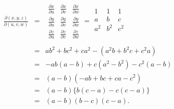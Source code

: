 \documentclass[a4paper,11pt,fleqn]{jarticle}
\begin{document}
\begin{eqnarray*}
\frac{\partial (x, y, z)}{\partial (u, v, w)}&=&
\begin{array}{|ccc|}
\frac{\partial x}{\partial u} & \frac{\partial x}{\partial v} & \frac{\partial x}{\partial w} \\
\frac{\partial y}{\partial u} & \frac{\partial y}{\partial v} & \frac{\partial y}{\partial w} \\
\frac{\partial z}{\partial u} & \frac{\partial z}{\partial v} & \frac{\partial z}{\partial w}
\end{array}
=
\begin{array}{|ccc|}
1&1&1\\
a&b&c\\
a^2&b^2&c^2\\
\end{array}
\\
&&\\
&=& ab^2+bc^2+ca^2-(a^2b+b^2c+c^2a)\\
&=&-ab(a-b)+c(a^2-b^2)-c^2(a-b)\\
&=& (a-b)(-ab+bc+ca-c^2)\\
&=& (a-b)\{b(c-a)-c(c-a)\}\\
&=& (a-b)(b-c)(c-a).
\end{eqnarray*}

\newpage
\end{document}
